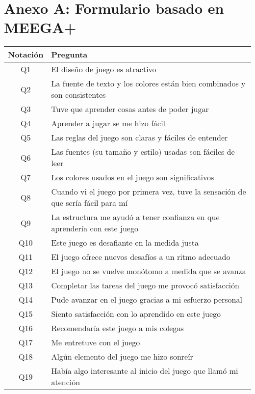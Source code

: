 \chapter{Anexo A: Formulario basado en MEEGA+} \label{AnexoA}


\begin{table}[]
\label{TablaFormularioMEEGA}
\begin{tabular}{|c|l|} %
\hline %
\textbf{Notación} & \textbf{Pregunta} \\\hline %
Q1       & El diseño de juego es atractivo \\ 
Q2       & La fuente de texto y los colores están bien combinados y son consistentes \\
Q3       & Tuve que aprender cosas antes de poder jugar \\
Q4       & Aprender a jugar se me hizo fácil \\
Q5       & Las reglas del juego son claras y fáciles de entender \\
Q6       & Las fuentes (su tamaño y estilo) usadas son fáciles de leer \\
Q7       & Los colores usados en el juego son significativos \\
Q8       & Cuando vi el juego por primera vez, tuve la sensación de que sería fácil para mí \\
Q9       & La estructura me ayudó a tener confianza en que aprendería con este juego \\
Q10      & Este juego es desafiante en la medida justa \\
Q11      & El juego ofrece nuevos desafíos a un ritmo adecuado \\
Q12      & El juego no se vuelve monótomo a medida que se avanza \\
Q13      & Completar las tareas del juego me provocó satisfacción \\
Q14      & Pude avanzar en el juego gracias a mi esfuerzo personal \\
Q15      & Siento satisfacción con lo aprendido en este juego \\
Q16      & Recomendaría este juego a mis colegas \\
Q17      & Me entretuve con el juego \\
Q18      & Algún elemento del juego me hizo sonreír \\
Q19      & Había algo interesante al inicio del juego que llamó mi atención \\

\end{tabular}
\end{table}
